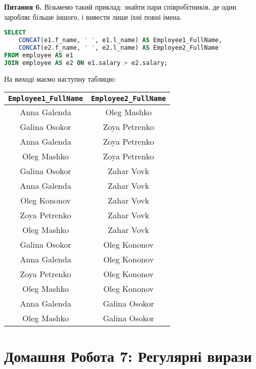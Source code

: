 \documentclass{hw_template}
\begin{document}
\textbf{Питання 6.} Візьмемо такий приклад: знайти пари співробітників, де один
заробляє більше іншого, і вивести лише їхні повні імена.
\begin{lstlisting}[language=SQL]
SELECT 
    CONCAT(e1.f_name, ' ', e1.l_name) AS Employee1_FullName, 
    CONCAT(e2.f_name, ' ', e2.l_name) AS Employee2_FullName
FROM employee AS e1
JOIN employee AS e2 ON e1.salary > e2.salary;
\end{lstlisting}

На виході маємо наступну таблицю:

\begin{table}[H]
    \centering
    \begin{tabular}{|c|c|}
        \hline
        \texttt{Employee1\_FullName} & \texttt{Employee2\_FullName} \\
        \hline
        Anna Galenda & Oleg Mashko \\
        Galina Osokor & Zoya Petrenko \\
        Anna Galenda & Zoya Petrenko \\
        Oleg Mashko & Zoya Petrenko\\
        Galina Osokor & Zahar Vovk\\
        Anna Galenda & Zahar Vovk\\
        Oleg Kononov & Zahar Vovk\\
        Zoya Petrenko & Zahar Vovk\\
        Oleg Mashko & Zahar Vovk\\
        Galina Osokor & Oleg Kononov\\
        Anna Galenda & Oleg Kononov\\
        Zoya Petrenko & Oleg Kononov\\
        Oleg Mashko & Oleg Kononov\\
        Anna Galenda & Galina Osokor\\
        Oleg Mashko & Galina Osokor\\
        \hline
    \end{tabular}
\end{table}

\newpage

\section{Домашня Робота 7: Регулярні вирази}
\end{document}
